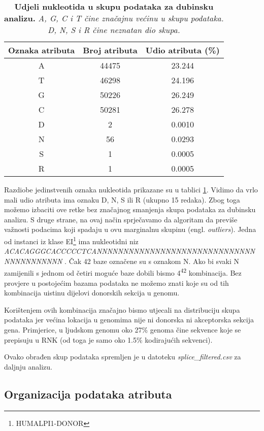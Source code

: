 \begin{table}[!ht]
   \caption[Udjeli nukleotida u skupu podataka za dubinsku analizu]{
   \textbf{Udjeli nukleotida u skupu podataka za dubinsku analizu.} \textit{A, G, C i T čine značajnu većinu u skupu podataka. D, N, S i R čine neznatan dio skupa.}}
   \centering
   \begin{tabular}{||c | c | c ||}
   \hline
   Oznaka atributa & Broj atributa & Udio atributa (\%) \\ [0.5ex]
   \hline\hline
   A & 44475 & 23.244 \\
   T & 46298 & 24.196 \\
   G & 50226 & 26.249 \\
   C & 50281 & 26.278 \\
   D & 2  & 0.0010 \\
   N & 56 & 0.0293 \\
   S & 1  & 0.0005 \\
   R & 1  & 0.0005 \\ [1ex]
   \hline
   \end{tabular}
   \label{tab:udjeli}
\end{table}
Razdiobe jedinstvenih oznaka nukleotida prikazane su u tablici \ref{tab:udjeli}. Vidimo da vrlo mali udio atributa ima oznaku D, N, S ili R (ukupno 15 redaka). Zbog toga možemo izbaciti ove retke bez značajnog smanjenja skupa podataka za dubinsku analizu. S druge strane, na ovaj način sprječavamo da algoritam da previše važnosti podacima koji spadaju u ovu marginalnu skupinu (engl. \textit{outliers}). 
Jedna od instanci iz klase EI\footnote{HUMALPI1-DONOR} ima nukleotidni niz\textit{ 
ACACAGGGCACCCCCTCANNNNNNNNNNNNNNNNNNNNNNNNNNNNNNNNNNNNNNNNN
}. Čak 42 baze označene su s oznakom N. Ako bi svaki N zamijenili s jednom od četiri moguće baze dobili bismo 4\textsuperscript{42} kombinacija. Bez provjere u postojećim bazama podataka ne možemo znati koje su od tih kombinacija uistinu dijelovi donorskih sekcija u genomu.

Korištenjem ovih kombinacija značajno bismo utjecali na distribuciju skupa podataka jer većina lokacija u genomima nije ni donorska ni akceptorska sekcija gena. Primjerice, u ljudskom genomu oko 27\% genoma čine sekvence koje se prepisuju u RNK (od toga je samo oko 1.5\% kodirajućih sekvenci)\cite{Berg01}.

Ovako obrađen skup podataka spremljen je u datoteku \textit{splice\_filtered.csv} za daljnju analizu.

\subsection{Organizacija podataka atributa}

